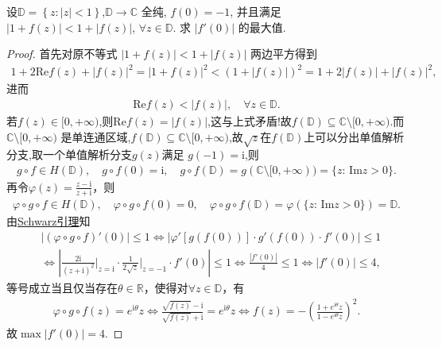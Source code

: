 \documentclass[../../main.tex]{subfiles}%
\begin{document}
\begin{example}
设$\mathbb{D} =\left\{ z:\left| z \right|<1 \right\}$,$\mathbb{D} \to \mathbb{C}$ 全纯, $f(0) = -1$, 并且满足 $|1 + f(z)| < 1 + |f(z)|$, $\forall z \in \mathbb{D}$. 求 $|f'(0)|$ 的最大值.
\end{example}
\begin{proof}
首先对原不等式 $|1 + f(z)| < 1 + |f(z)|$ 两边平方得到
\begin{align*}
1 + 2\mathrm{Re}f(z) + |f(z)|^2 = |1 + f(z)|^2  < (1 + |f(z)|)^2 = 1 + 2|f(z)| + |f(z)|^2,
\end{align*}
进而
\begin{align*}
\mathrm{Re}f(z) < |f(z)|, \quad \forall z \in \mathbb{D}.
\end{align*}
若$f(z)\in [0,+\infty)$,则$\mathrm{Re}f(z)=|f(z)|$,这与上式矛盾!故$f(\mathbb{D}) \subseteq \mathbb{C} \setminus [0,+\infty).$而 $\mathbb{C} \setminus [0,+\infty)$ 是单连通区域,$f(\mathbb{D}) \subseteq \mathbb{C} \setminus [0,+\infty)$,故$\sqrt{z}$在$f(\mathbb{D})$上可以分出单值解析分支,取一个单值解析分支$g(z)$满足 $g(-1) = \mathrm{i}$,则
\begin{align*}
g\circ f\in H(\mathbb{D} ),\quad g\circ f(0)=\mathrm{i},\quad g\circ f(\mathbb{D} )=g(\mathbb{C} \setminus [0,+\infty ))=\{z:\,\mathrm{Im}z>0\}.
\end{align*}
再令$\varphi(z)=\frac{z-\mathrm{i}}{z+\mathrm{i}}$，则
\begin{align*}
\varphi\circ g\circ f\in H(\mathbb{D}),\quad \varphi\circ g\circ f(0)=0,\quad \varphi\circ g\circ f(\mathbb{D})=\varphi(\{z:\,\mathrm{Im}z>0\})=\mathbb{D}.
\end{align*}
由\hyperref[theorem:Schwarz引理-定理4.5.3]{Schwarz引理}知
\begin{align*}
&\left|(\varphi\circ g\circ f)'(0)\right|\leqslant 1\Longleftrightarrow \left|\varphi'\left[g(f(0))\right]\cdot g'(f(0))\cdot f'(0)\right|\leqslant 1\\
&\Longleftrightarrow \left|\frac{2\mathrm{i}}{(z+\mathrm{i})^2}\bigg|_{z=\mathrm{i}}\cdot \frac{1}{2\sqrt{z}}\bigg|_{z=-1}\cdot f'(0)\right|\leqslant 1\Longleftrightarrow \frac{|f'(0)|}{4}\leqslant 1\Longleftrightarrow |f'(0)|\leqslant 4,
\end{align*}
等号成立当且仅当存在$\theta\in\mathbb{R}$，使得对$\forall z\in\mathbb{D}$，有
\begin{align*}
\varphi\circ g\circ f(z)=e^{\mathrm{i}\theta}z\Longleftrightarrow \frac{\sqrt{f(z)}-\mathrm{i}}{\sqrt{f(z)}+\mathrm{i}}=e^{\mathrm{i}\theta}z\Longleftrightarrow f(z)=-\left(\frac{1+e^{\mathrm{i}\theta}z}{1-e^{\mathrm{i}\theta}z}\right)^2.
\end{align*}
故$\max \left| f' \left( 0 \right) \right|=4$.
\end{proof}
\end{document}
